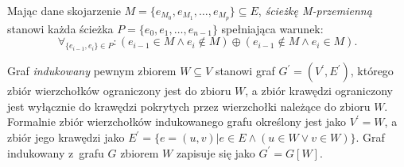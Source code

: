 \begin{definition}
  Mając dane skojarzenie ${M=\{e_{M_0}, e_{M_1}, \ldots, e_{M_p}\} \subseteq E}$,
  \emph{ścieżkę M-przemienną} stanowi każda ścieżka $P=\{e_0, e_1, \ldots, e_{n-1}\}$ spełniająca warunek: 
  \[\forall_{\{e_{i-1}, e_i\} \in P}: (e_{i-1} \in M \land e_i \notin M) \oplus  (e_{i-1} \notin M \land e_i \in M).\]
\end{definition}

\begin{definition}
  Graf \emph{indukowany} pewnym zbiorem $W \subseteq V$ stanowi graf $G^\prime=(V^\prime, E^\prime)$, którego zbiór wierzchołków ograniczony jest do zbioru $W$, a zbiór krawędzi ograniczony jest wyłącznie do krawędzi pokrytych przez wierzchołki należące do zbioru $W$.
  Formalnie zbiór wierzchołków indukowanego grafu określony jest jako $V^\prime = W$, a zbiór jego krawędzi jako $E^\prime=\{e=(u,v)|e\in E \land (u \in W \lor v \in W)\}$.
  Graf indukowany z~grafu $G$ zbiorem $W$ zapisuje się jako $G^\prime = G[W]$.
\end{definition}
